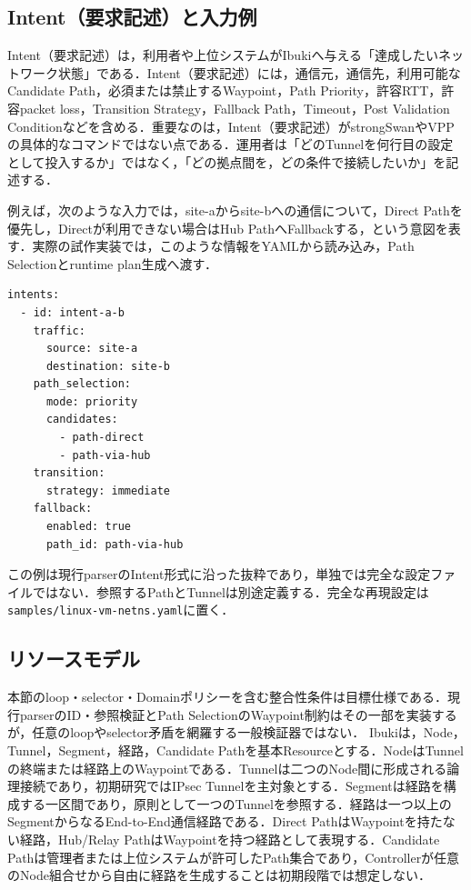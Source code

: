 \documentclass[11pt,a4paper,twoside]{ltjsarticle}
\begin{document}
\subsection{Intent（要求記述）と入力例}
Intent（要求記述）は，利用者や上位システムがIbukiへ与える「達成したいネットワーク状態」である．Intent（要求記述）には，通信元，通信先，利用可能なCandidate Path，必須または禁止するWaypoint，Path Priority，許容RTT，許容packet loss，Transition Strategy，Fallback Path，Timeout，Post Validation Conditionなどを含める．重要なのは，Intent（要求記述）がstrongSwanやVPPの具体的なコマンドではない点である．運用者は「どのTunnelを何行目の設定として投入するか」ではなく，「どの拠点間を，どの条件で接続したいか」を記述する．

例えば，次のような入力では，site-aからsite-bへの通信について，Direct Pathを優先し，Directが利用できない場合はHub PathへFallbackする，という意図を表す．実際の試作実装では，このような情報をYAMLから読み込み，Path Selectionとruntime plan生成へ渡す．

\begin{verbatim}
intents:
  - id: intent-a-b
    traffic:
      source: site-a
      destination: site-b
    path_selection:
      mode: priority
      candidates:
        - path-direct
        - path-via-hub
    transition:
      strategy: immediate
    fallback:
      enabled: true
      path_id: path-via-hub
\end{verbatim}

この例は現行parserのIntent形式に沿った抜粋であり，単独では完全な設定ファイルではない．参照するPathとTunnelは別途定義する．完全な再現設定は\texttt{samples/linux-vm-netns.yaml}に置く．

\subsection{リソースモデル}
本節のloop・selector・Domainポリシーを含む整合性条件は目標仕様である．現行parserのID・参照検証とPath SelectionのWaypoint制約はその一部を実装するが，任意のloopやselector矛盾を網羅する一般検証器ではない．
Ibukiは，Node，Tunnel，Segment，経路，Candidate Pathを基本Resourceとする．NodeはTunnelの終端または経路上のWaypointである．Tunnelは二つのNode間に形成される論理接続であり，初期研究ではIPsec Tunnelを主対象とする．Segmentは経路を構成する一区間であり，原則として一つのTunnelを参照する．経路は一つ以上のSegmentからなるEnd-to-End通信経路である．Direct PathはWaypointを持たない経路，Hub/Relay PathはWaypointを持つ経路として表現する．Candidate Pathは管理者または上位システムが許可したPath集合であり，Controllerが任意のNode組合せから自由に経路を生成することは初期段階では想定しない．
\end{document}
